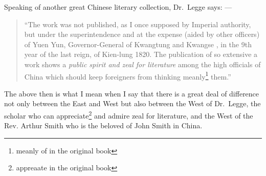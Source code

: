 Speaking of another great Chinese literary collection, Dr.~Legge says: --- 
\begin{quote}
``The work was not published, as I once supposed by Imperial authority, but under the superintendence and at the expense (aided by other officers) of Yuen Yun,  Governor-General of Kwangtung  and Kwangse , in the 9th year of the last reign, of Kien-lung 1820. 
The publication of so extensive a work shows a \emph{public spirit and zeal for literature} among the high officials of China which should keep foreigners from thinking meanly\footnote{meanly of in the original book} them.''
\end{quote}

The above then is what I mean when I say that there is a great deal of difference not only between the East and West but also between the West of Dr.~Legge, the scholar who can appreciate\footnote{appreaate in the original book} and admire zeal for literature, and the West of the Rev. Arthur Smith who is the beloved of John Smith in China.
